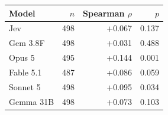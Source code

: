\begin{tabular}{lrrr}
\toprule
Model & $n$ & Spearman $\rho$ & $p$ \\
\midrule
Jev & 498 & +0.067 & 0.137 \\
Gem 3.8F & 498 & +0.031 & 0.488 \\
Opus 5 & 495 & +0.144 & 0.001 \\
Fable 5.1 & 487 & +0.086 & 0.059 \\
Sonnet 5 & 498 & +0.095 & 0.034 \\
Gemma 31B & 498 & +0.073 & 0.103 \\
\bottomrule
\end{tabular}
